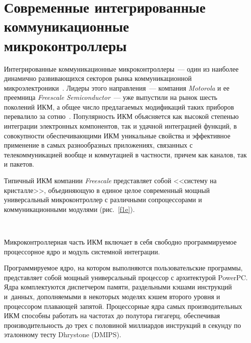       \begin{multicols}{2}

      \label{st\stat}
   

\section{Современные интегрированные коммуникационные 
микроконтроллеры}
     
     Интегрированные коммуникационные микроконтроллеры~--- один из наиболее 
динамично развивающихся секторов рынка коммуникационной 
     микроэлектроники~\cite{4e, 5e}. Лидеры этого направления~--- компания 
\textit{Motorola} и ее преемница \textit{Freescale Semiconductor}~--- уже выпустили на рынок 
шесть поколений ИКМ, а общее число предлагаемых модификаций таких приборов 
перевалило за сотню~\cite{10e}. Популярность ИКМ объясняется как высокой степенью 
интеграции электронных компонентов, так и удачной интеграцией функций, в совокупности 
обеспечивающими ИКМ уникальные свойства и эффективное применение в самых 
разнообразных приложениях, связанных с телекоммуникацией вообще и коммутацией в 
частности, причем как каналов, так и пакетов.
     
     Типичный ИКМ компании \textit{Freescale} пред\-став\-ля\-ет собой <<систему на 
кристалле>>, объ\-еди\-ня\-ющую в единое целое современный мощный универсальный 
микроконтроллер с различными %
сопро\-цес\-со\-ра\-ми и коммуникационными 
модулями (рис.~\ref{f1e}).
{

}


\begin{figure*} %
\vspace*{1pt}
\begin{center}
\mbox{%
\epsfxsize=164.253mm
}
\end{center}
\vspace*{-9pt}
\end{figure*}

     Микроконтроллерная часть ИКМ включает в себя свободно программируемое 
процессорное ядро и модуль системной интеграции.
     
     Программируемое ядро, на котором выполняются пользовательские программы, 
представляет собой мощный универсальный процессор с архитектурой PowerPC. Ядра 
комплектуются диспетчером памяти, раздельными кэшами инструкций и~данных, 
дополняемыми в некоторых моделях %
кэшем второго уровня и процессором плавающей 
запя\-той. Процессорные ядра самых производительных ИКМ способны работать на частотах 
до полутора гигагерц, обеспечивая производительность до трех с половиной миллиардов 
инструкций в секунду по эталонному тесту Dhrystone (DMIPS).
     

\end{multicols}

